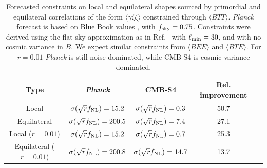 


\begin{table}[t]
  \begin{center}
    \begin{tabular}{ | c || c | c | c | c |}
      \hline
      Type & {\it Planck} & CMB-S4 & Rel. improvement  \\ \hline \hline
      Local & $\sigma(\sqrt{r}f_{\rm NL}) = 15.2$ & $\sigma(\sqrt{r}f_{\rm NL}) = 0.3$ & 50.7\\ \hline 
      Equilateral &  $\sigma(\sqrt{r}f_{\rm NL}) = 200.5$ & $\sigma(\sqrt{r}f_{\rm NL}) = 7.4$ & 27.1\\ \hline 
      Local ($r = 0.01$) & $\sigma(\sqrt{r}f_{\rm NL}) = 15.2$ & $\sigma(\sqrt{r}f_{\rm NL}) = 0.7$ & 25.3\\ \hline 
      Equilateral ($r = 0.01$) &  $\sigma(\sqrt{r}f_{\rm NL}) = 200.8$ & $\sigma(\sqrt{r}f_{\rm NL}) = 14.7$ & 13.7\\ \hline 
    \end{tabular}
  \end{center}
  \caption{Forecasted constraints on local and equilateral shapes sourced by primordial and equilateral correlations of the form $\langle \gamma \zeta\zeta \rangle$ constrained through $\langle BTT \rangle$. {\it Planck\/} forecast is based on Blue Book values \cite{planck2005-bluebook}, with $f_{\rm sky} = 0.75$. Constraints were derived using the flat-sky approximation as in Ref.~\cite{Meerburg:2016ecv} with $\ell_{\rm min} = 30$, and with no cosmic variance in $B$.  We expect similar constraints from $\langle BEE \rangle$ and $\langle BTE \rangle$. For $r = 0.01$ {\it Planck\/} is still noise dominated, while CMB-S4 is cosmic variance dominated. }
\label{tab:fnl_forecast2}
\end{table}



